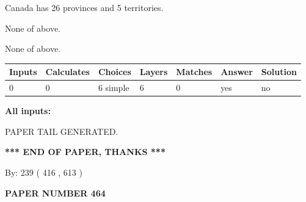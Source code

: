 \documentclass[12pt]{article}
\begin{document}
 
Canada has  26 provinces and  5 territories.
 
 
 None of above.
 
 
\noindent{}
 
 
 None of above.
 
 
\noindent{}
 
 
   
   
   
   
\noindent\begin{tabular}{|l|l|l|l|l|l|l|}
 \hline
Inputs & Calculates & Choices & Layers & Matches & Answer & Solution \\ \hline
 0  & 
 0  & 
 6
  simple  
  & 
 6  & 
 0  & 
  yes & 
  no 
  \\ \hline
 \end{tabular}
   
   
   
   
\noindent{}
   
   
   
   
\noindent\vspace{0.1in}\hspace{-0.08in} {\textbf{\Large{All inputs: }}}
   
   
   
   
   
   
 \vspace{0.2in}
 
   
   
\vspace{2.0in} PAPER TAIL GENERATED.
   
   
   
   
\vspace{1.0in} 
{\textbf{\large{ *** END OF PAPER, THANKS *** }}} 
   
   
\hspace{1.0in} By: 
 239 ( 416 ,  613 )
   
   
   
   
\newpage 
\setcounter{page}{ 
   464001 } 
   
   
   
   
 {\textbf{ \Large{ PAPER NUMBER  464  }}}
   
\end{document}
